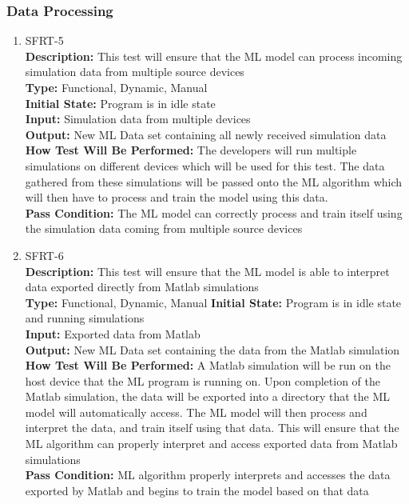 \documentclass[12pt, titlepage]{article}
\begin{document}
\subsubsection{Data Processing}
\begin{enumerate}
    \item{SFRT-5\\}
    \textbf{Description:} This test will ensure that the ML model can process incoming simulation data from multiple source devices\\
    \textbf{Type:} Functional, Dynamic, Manual\\
    \textbf{Initial State:} Program is in idle state\\
    \textbf{Input:} Simulation data from multiple devices\\
    \textbf{Output:} New ML Data set containing all newly received simulation data
    \textbf{How Test Will Be Performed:} The developers will run multiple simulations on different devices which will be used for this test. The data gathered from these simulations will be passed onto the ML algorithm which will then have to process and train the model using this data.\\
    \textbf{Pass Condition:} The ML model can correctly process and train itself using the simulation data coming from multiple source devices\\

    \item{SFRT-6\\}
    \textbf{Description:} This test will ensure that the ML model is able to interpret data exported directly from Matlab simulations\\
    \textbf{Type:} Functional, Dynamic, Manual
    \textbf{Initial State:} Program is in idle state and running simulations\\
    \textbf{Input:} Exported data from Matlab\\
    \textbf{Output:} New ML Data set containing the data from the Matlab simulation\\
    \textbf{How Test Will Be Performed:} A Matlab simulation will be run on the host device that the ML program is running on. Upon completion of the Matlab simulation, the data will be exported into a directory that the ML model will automatically access. The ML model will then process and interpret the data, and train itself using that data. This will ensure that the ML algorithm can properly interpret and access exported data from Matlab simulations\\
    \textbf{Pass Condition:} ML algorithm properly interprets and accesses the data exported by Matlab and begins to train the model based on that data\\
\end{enumerate}
\end{document}
